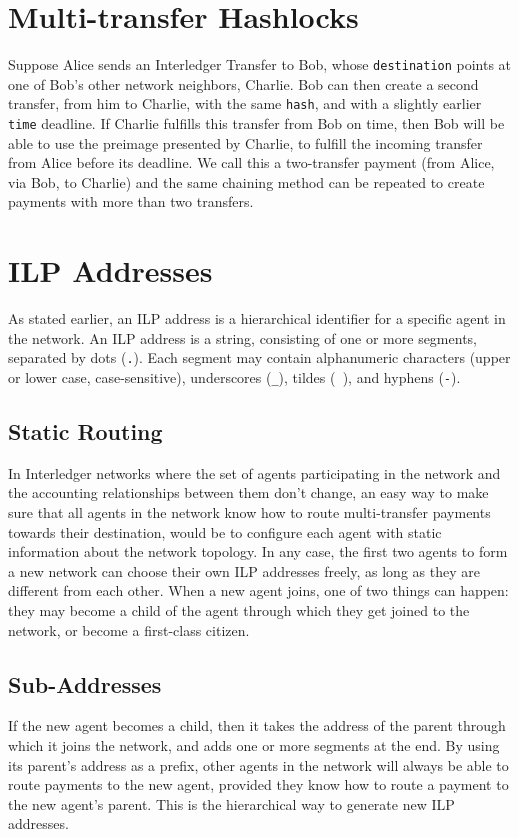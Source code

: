 \documentclass[11pt,twoside,a4paper]{article}
\begin{document}
\section{Multi-transfer Hashlocks}
Suppose Alice sends an Interledger Transfer to Bob, whose {\tt destination} points at one of Bob's other network neighbors, Charlie. Bob can then create a second
transfer, from him to Charlie, with the same {\tt hash}, and with a slightly earlier {\tt time} deadline. If Charlie fulfills this transfer from Bob on time, then Bob will be able
to use the preimage presented by Charlie, to fulfill the incoming transfer from Alice before its deadline. We call this a two-transfer payment (from Alice, via Bob, to Charlie) and the same
chaining method can be repeated to create payments with more than two transfers.

\section{ILP Addresses}
As stated earlier, an ILP address is a hierarchical identifier for a specific agent in the network.
An ILP address is a string, consisting of one or more segments, separated by dots ({\tt .}). Each segment may contain alphanumeric characters (upper or lower case, case-sensitive),
underscores ({\tt \_}),
tildes ({\tt ~}),
and hyphens ({\tt -}).

\subsection{Static Routing}
In Interledger networks where the set of agents participating in the network and the accounting relationships between them don't change,
an easy way to make sure that all agents in the network know how to route multi-transfer payments towards their destination, would be to configure each agent with static information about the
network topology.
In any case, the first two agents to form a new network can choose their own ILP addresses freely, as long as they are different from each other. When a new agent joins, one of two things can happen:
they may become a child of the agent through which they get joined to the network, or become a first-class citizen.

\subsection{Sub-Addresses}
If the new agent becomes a child, then it takes the address of the parent through which it joins the network, and adds one or more segments at the end. By using its parent's address as a
prefix, other agents in the network will always be able to route payments to the new agent, provided they know how to route a payment to the new agent's parent. This is the hierarchical
way to generate new ILP addresses.
\end{document}

